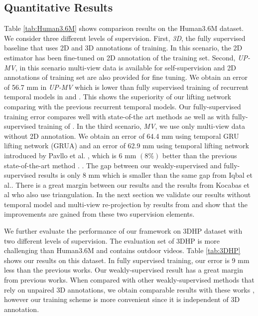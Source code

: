 \documentclass[10pt,twocolumn,letterpaper]{article}
\begin{document}
\subsection{Quantitative Results}
Table \ref{tab:Human3.6M} shows comparison results on the Human3.6M dataset. We consider three different levels of supervision. 
First, \textit{3D}, the fully supervised baseline that uses 2D and 3D annotations of training. In this scenario, the 2D estimator has been fine-tuned on 2D annotation of the training set. 
Second, \textit{UP-MV}, in this scenario multi-view data is available for self-supervision and 2D annotations of training set are also provided for fine tuning. We obtain an error of 56.7 mm in \textit{UP-MV} which is lower than fully supervised training of recurrent temporal models in \cite{Hossain_2018_ECCV} and \cite{Kocabas_2020_CVPR}. This shows the superiority of our lifting network comparing with the previous recurrent temporal models. Our fully-supervised training error compares well with state-of-the art methods ae well as with fully-supervised training of \cite{Iqbal_2020_CVPR}. 
In the third scenario, \textit{MV}, we use only multi-view data without 2D annotation. We obtain an error of 64.4 mm using temporal GRU lifting network (GRUA) and an error of 62.9 mm using  temporal lifting network introduced by Pavllo et al. \cite{Pavllo_2019_CVPR}, which is 6 mm $(8\%)$ better than the previous state-of-the-art method \cite{Iqbal_2020_CVPR}.  \cite{wandt2020canonpose}. The gap between our weakly-supervised and fully-supervised results is only 8 mm which is smaller than the same gap from Iqbal et al.\cite{Iqbal_2020_CVPR}. There is a great margin between our results and the results from Kocabas et al \cite{Kocabas_2019_CVPR} who also use triangulation. In the next section we validate our results without temporal model and multi-view re-projection by results from \cite{Kocabas_2019_CVPR} and show that the improvements are gained from these two supervision elements.

We further evaluate the performance of our framework on 3DHP dataset with two different levels of supervision. The evaluation set of 3DHP is more challenging than Human3.6M and contains outdoor videos. Table \ref{tab:3DHP} shows our results on this dataset. In fully supervised training, our error is 9 mm less than the previous works. Our weakly-supervised result has a great margin from previous works. When compared with other weakly-supervised methods that rely on unpaired 3D annotations, we obtain comparable results with these works \cite{Kundu_2020_CVPR}, however our training scheme is more convenient since it is independent of 3D annotation. 
\end{document}
